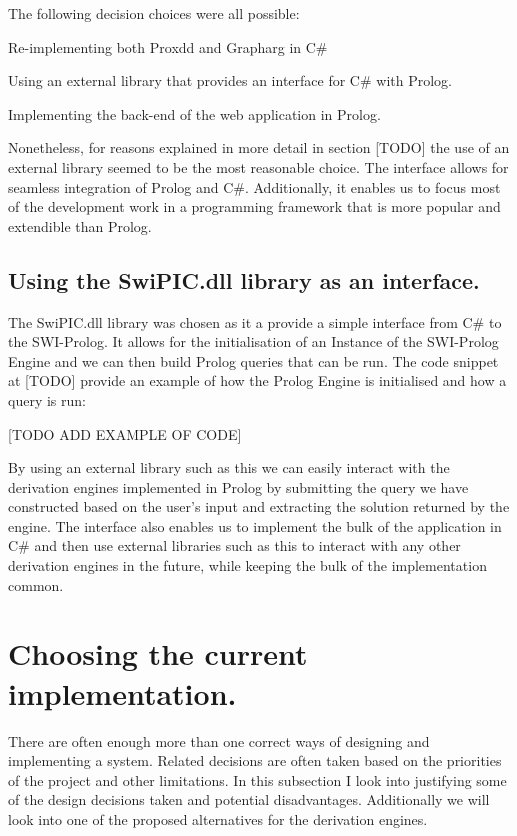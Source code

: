 The following decision choices were all possible:

\begin{itemize*}
\item Re-implementing both Proxdd and Grapharg in C\#
\item Using an external library that provides an interface for C\# with Prolog.
\item Implementing the back-end of the web application in Prolog.
\end{itemize*}

Nonetheless, for reasons explained in more detail in section [TODO] the use of an external library seemed to be the most reasonable choice. The interface allows for seamless integration of Prolog and C\#. Additionally, it enables us to focus most of the development work in a programming framework that is more popular and extendible than Prolog.

\subsection{Using the SwiPIC.dll library as an interface.}

The SwiPIC.dll library was chosen as it a provide a simple interface from C\# to the SWI-Prolog. It allows for the initialisation of an Instance of the SWI-Prolog Engine and we can then build Prolog queries that can be run. The code snippet at [TODO] provide an example of how the Prolog Engine is initialised and how a query is run:

[TODO ADD EXAMPLE OF CODE]

By using an external library such as this we can easily interact with the derivation engines implemented in Prolog by submitting the query we have constructed based on the user's input and extracting the solution returned by the engine. The interface also enables us to implement the bulk of the application in C\# and then use external libraries such as this to interact with any other derivation engines in the future, while keeping the bulk of the implementation common.

\section{Choosing the current implementation.}

There are often enough more than one correct ways of designing and implementing a system. Related decisions are often taken based on the priorities of the project and other limitations. In this subsection I look into justifying some of the design decisions taken and potential disadvantages. Additionally we will look into one of the proposed alternatives for the derivation engines.

